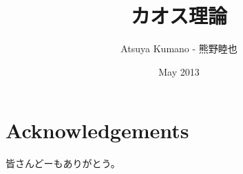 \documentclass[12pt,twoside,draft]{reedthesis}
\title{カオス理論}
\author{Atsuya Kumano - 熊野睦也}
\date{May 2013}
\begin{document}
\maketitle
\frontmatter %
\pagestyle{empty} %

\chapter*{Acknowledgements}
皆さんどーもありがとう。

\tableofcontents


\mainmatter %
\pagestyle{fancyplain} %




















\end{document}
